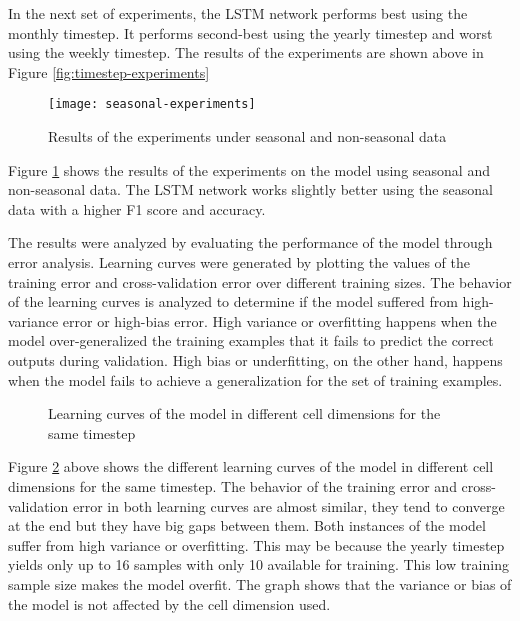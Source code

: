 \documentclass[a0]{sciposter}
\begin{document}
\begin{multicols}{2}
    In the next set of experiments, the LSTM network performs best using the monthly timestep. It performs second-best using the yearly timestep and worst using the weekly timestep. The results of the experiments are shown above in Figure \ref{fig:timestep-experiments}

    \begin{figure}[ht]
    \centering
    \texttt{[image: seasonal-experiments]}
    \caption{Results of  the experiments under seasonal and non-seasonal data}
    \label{fig:seasonal-experiments}
    \end{figure}

    Figure \ref{fig:seasonal-experiments} shows the results of the experiments on the model using seasonal and non-seasonal data. The LSTM network works slightly better using the seasonal data with a higher F1 score and accuracy.

    The results were analyzed by evaluating the performance of the model through error analysis. Learning curves were generated by plotting the values of the training error and cross-validation error over different training sizes. The behavior of the learning curves is analyzed to determine if the model suffered from high-variance error or high-bias error. High variance or overfitting happens when the model over-generalized the training examples that it fails to predict the correct outputs during validation. High bias or underfitting, on the other hand, happens when the model fails to achieve a generalization for the set of training examples.

    \begin{figure} \label{fig:dimension-learning-curve}
    \centering
    \caption{Learning curves of the model in different cell dimensions for the same timestep}
    \end{figure}

    Figure \ref{fig:dimension-learning-curve} above shows the different learning curves of the model in different cell dimensions for the same timestep. The behavior of the training error and cross-validation error in both learning curves are almost similar, they tend to converge at the end but they have big gaps between them. Both instances of the model suffer from high variance or overfitting. This may be because the yearly timestep yields only up to 16 samples with only 10 available for training. This low training sample size makes the model overfit. The graph shows that the variance or bias of the model is not affected by the cell dimension used.


\end{multicols}
\end{document}
